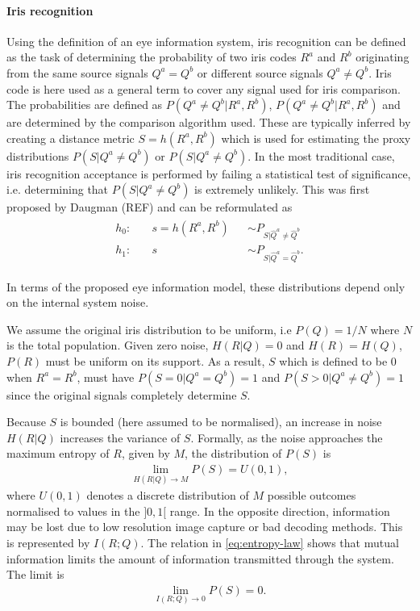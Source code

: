 \paragraph{Iris recognition}
Using the definition of an eye information system, iris recognition can be defined as the task of determining the probability of two iris codes $R^a$ and $R^b$ originating from the same source signals $Q^a = Q^b$ or different source signals $Q^a\neq Q^b$. Iris code is here used as a general term to cover any signal used for iris comparison. The probabilities are defined as $P(Q^a\neq Q^b|R^a, R^b)$, $P(Q^a\neq Q^b|R^a, R^b)$ and are determined by the comparison algorithm used. These are typically inferred by creating a distance metric $S = h(R^a, R^b)$ which is used for estimating the proxy distributions $P(S|Q^a\neq Q^b)$ or $P(S|Q^a\neq Q^b)$. In the most traditional case, iris recognition acceptance is performed by failing a statistical test of significance, i.e. determining that $P(S|Q^a\neq Q^b)$ is extremely unlikely. This was first proposed by Daugman (REF) and can be reformulated as
\begin{align}
\begin{aligned}
    h_0: & \quad s = h(R^a, R^b) &&\sim  P_{S|\hat{Q}^a\neq \hat{Q}^b}\\
    h_1: & \quad s && \sim  P_{S|\hat{Q}^a = \hat{Q}^b}.
\end{aligned}
\end{align}

In terms of the proposed eye information model, these distributions depend only on the internal system noise. 

We assume the original iris distribution to be uniform, i.e $P(Q)=1/N$ where $N$ is the total population. Given zero noise, $H(R|Q)=0$ and $H(R)=H(Q)$, $P(R)$ must be uniform on its support. As a result, $S$ which is defined to be $0$ when $R^a = R^b$, must have $P(S=0|Q^a = Q^b)=1$ and $P(S>0|Q^a \neq Q^b)=1$ since the original signals completely determine $S$. 

Because $S$ is bounded (here assumed to be normalised), an increase in noise $H(R|Q)$ increases the variance of $S$. Formally, as the noise approaches the maximum entropy of $R$, given by $M$, the distribution of $P(S)$ is
\begin{align}
\lim_{H(R|Q)\rightarrow M} P(S) = U(0, 1),
\end{align}
where $U(0, 1)$ denotes a discrete distribution of $M$ possible outcomes normalised to values in the $]0, 1[$ range. In the opposite direction, information may be lost due to low resolution image capture or bad decoding methods. This is represented by $I(R;Q)$. The relation in \autoref{eq:entropy-law} shows that mutual information limits the amount of information transmitted through the system. The limit is
\begin{align}
\lim_{I(R;Q)\rightarrow 0} P(S) = 0.
\end{align}

